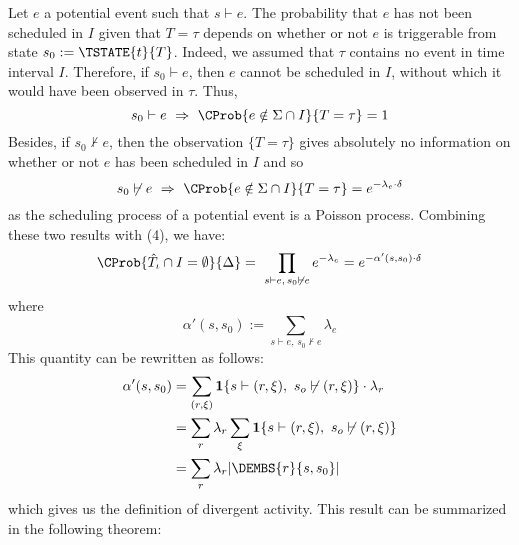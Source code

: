 Let $e$ a potential event such that $s \vdash e$. The probability that
$e$ has not been scheduled in $I$ given that $T=\tau$ depends on
whether or not $e$ is triggerable from state $s_0 :=
\TSTATE{t}{T}$. Indeed, we assumed that $\tau$ contains no event in
time interval $I$. Therefore, if $s_0 \vdash e$, then $e$ cannot be
scheduled in $I$, without which it would have been observed in $\tau$.
Thus,
\[ s_0 \vdash e \ \Rightarrow\ \CProb{e \notin \Sigma \cap I}{ T=\tau
  } = 1 \] Besides, if $s_0 \not\vdash e$, then the observation
$\{ T=\tau \}$ gives absolutely no information on whether or not $e$
has been scheduled in $I$ and so
\[ s_0 \not\vdash e \ \Rightarrow\ \CProb{e \notin \Sigma \cap I}{
    T=\tau } = e^{-\lambda_e \cdot \delta} \] as the scheduling
process of a potential event is a Poisson process. Combining these two
results with (4), we have:
\begin{align}
  \CProb{ \hat T_\iota \cap I = \emptyset }{ \Delta }
  =\ \prod_{s \vdash e, \, s_0 \not\vdash e} e^{-\lambda_e} = e^{-\alpha'(s, s_0)\cdot\delta}
\end{align}
where
\[\alpha'(s, s_0) := \sum_{s \vdash e, \, s_0 \not\vdash e}
  \lambda_e \] This quantity can be rewritten as follows:
\begin{align}
  \alpha'(s, s_0) &= 
                    \sum_{(r, \xi)} \textbf{1}\{ s \vdash (r, \xi),\ s_o \not\vdash (r, \xi) \}\cdot\lambda_r \\
                  &= \sum_r \lambda_r\sum_\xi \textbf{1}\{ s \vdash (r, \xi),\ s_o \not\vdash (r, \xi) \} \\
                  &= \sum_r \lambda_r |\DEMBS{r}{s, s_0}|
\end{align}
which gives us the definition of divergent activity. This result can
be summarized in the following theorem:

